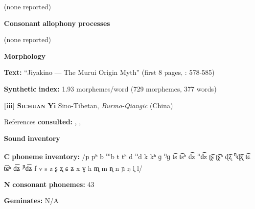 \begin{styleBody}
(none reported)
\end{styleBody}

\begin{styleBody}
\textbf{Consonant} \textbf{allophony} \textbf{processes}
\end{styleBody}

\begin{styleBody}
(none reported)
\end{styleBody}

\begin{styleBody}
\textbf{Morphology}
\end{styleBody}

\begin{styleBody}
\textbf{Text:} “Jiyakino — The Murui Origin Myth” (first 8 pages, \citealt{Wojtylak2017}: 578-585)
\end{styleBody}

\begin{styleBody}
\textbf{Synthetic} \textbf{index:} 1.93 morphemes/word (729 morphemes, 377 words)
\end{styleBody}

\begin{styleBody}
\textbf{[iii]}   \textbf{\textsc{Sichuan} \textbf{Yi}}  Sino-Tibetan, \textit{Burmo-Qiangic} (China)
\end{styleBody}

\begin{styleBody}
References \textbf{consulted:} \citet{Gerner2013}, \citet{Maoji1997}, \citet{Merrifield2012}
\end{styleBody}

\begin{styleBody}
\textbf{Sound} \textbf{inventory}
\end{styleBody}

\begin{styleBody}
\textbf{C} \textbf{phoneme} \textbf{inventory:} /p pʰ b \textsuperscript{m}b t tʰ d \textsuperscript{n}d k kʰ ɡ \textsuperscript{ŋ}ɡ t͡s t͡sʰ d͡z \textsuperscript{n}d͡z ʈ͡ʂ ʈ͡ʂʰ ɖ͡ʐ \textsuperscript{ɳ}ɖ͡ʐ t͡ɕ t͡ɕʰ d͡ʑ \textsuperscript{ɲ}d͡ʑ f v s z ʂ ʐ ɕ ʑ x ɣ h m̥ m n̥ n ɲ ŋ l̥ l/
\end{styleBody}

\begin{styleBody}
\textbf{N} \textbf{consonant} \textbf{phonemes:} 43
\end{styleBody}

\begin{styleBody}
\textbf{Geminates:} N/A
\end{styleBody}

